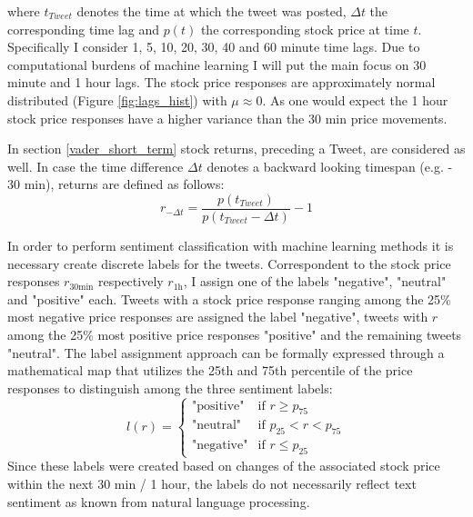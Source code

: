 \documentclass[a4paper,12pt]{article}%
\begin{document}
where $t_{Tweet}$ denotes the time at which the tweet was posted,  $\Delta t$ the corresponding time lag and $p(t)$ the corresponding stock price at time $t$. Specifically I consider 1, 5, 10, 20, 30, 40 and 60 minute time lags. Due to computational burdens of machine learning I will put the main focus on 30 minute and 1 hour lags. 
The stock price responses are approximately normal distributed (Figure \ref{fig:lags_hist}) with $\mu \approx 0$. As one would expect the 1 hour stock price responses have a higher variance than the 30 min price movements.
 

In section \ref{vader_short_term} stock returns, preceding a Tweet, are considered as well. In case the time difference $\Delta t$ denotes a backward looking timespan (e.g. - 30 min), returns are defined as follows:
\begin{equation}
r_{- \Delta t} = \frac{p(t_{Tweet})}{p(t_{Tweet} - \Delta t)} - 1
\end{equation}


In order to perform sentiment classification with machine learning methods it is necessary create discrete labels for the tweets. Correspondent to the stock price responses $r_{30\text{min}}$ respectively $r_{1 \text{h}}$, I assign one of the labels "negative", "neutral" and "positive" each. Tweets with a stock price response ranging among the 25\% most negative price responses are assigned the label "negative", tweets with $r$ among the 25\% most positive price responses "positive" and the remaining tweets "neutral". The label assignment approach can be formally expressed through a mathematical map that utilizes the 25th and 75th percentile of the price responses to distinguish among the three sentiment labels:
%
\begin{equation}
 l(r) =
   \begin{cases}
     \text{"positive"} & \text{if } r \geq p_{75}\\
     \text{"neutral"}  & \text{if }  p_{25} < r < p_{75} \\
     \text{"negative"}  & \text{if } r \leq p_{25}
   \end{cases}
\end{equation}
Since these labels were created based on changes of the associated stock price within the next 30 min / 1 hour, the labels do not necessarily reflect text sentiment as known from natural language processing. 
\end{document}
